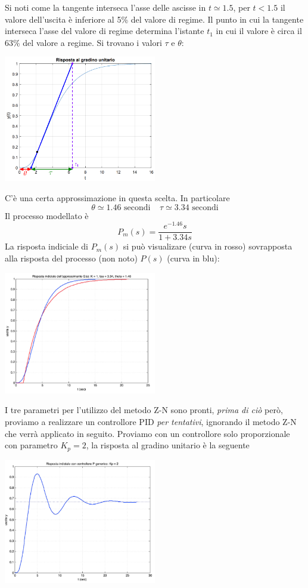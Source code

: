 \documentclass[10pt, letterpaper]{report}
\begin{document}
Si noti come la tangente interseca l'asse delle ascisse in $t\simeq 1.5$, per $t< 1.5$ il valore dell'uscita è inferiore al 5\% del valore di regime. Il punto in cui la tangente interseca l'asse del valore di regime determina l'istante $t_1$ in cui il valore è circa il 63\% del valore a regime. Si trovano i valori $\tau$ e $\theta$:
\begin{center}
    \includegraphics[width=0.5\textwidth]{images/ZN4.eps}
\end{center}
C'è una certa approssimazione in questa scelta. In particolare
$$ \theta \simeq 1.46 \text{ secondi} \ \ \ \ \ \tau \simeq  3.34 \text{ secondi}$$
Il processo modellato è 
$$ P_m(s)=\frac{e^{-1.46}s}{1+3.34 s}$$
La risposta indiciale di $P_m(s)$ si può visualizare (curva in rosso) sovrapposta alla risposta del processo (non noto) $P(s)$ (curva in blu):
\begin{center}
    \includegraphics[width=0.5\textwidth]{images/ZN5.png}
\end{center}
I tre parametri per l'utilizzo del metodo Z-N sono pronti, \textit{prima di ciò} però, proviamo a realizzare un controllore PID \textit{per tentativi}, ignorando il metodo Z-N che verrà applicato in seguito. \acc 
Proviamo con un controllore solo proporzionale con parametro $K_p=2$, la risposta al gradino unitario è la seguente
\begin{center}
    \includegraphics[width=0.5\textwidth]{images/tentativi.png}
\end{center}
\end{document}
